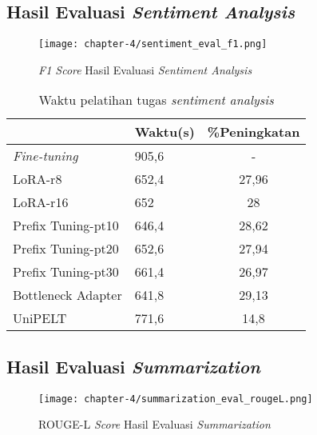 \subsection{Hasil Evaluasi \textit{Sentiment Analysis}}

\begin{figure}[h]
    \centering
    \texttt{[image: chapter-4/sentiment\_eval\_f1.png]}
    \caption{\textit{F1 Score} Hasil Evaluasi \textit{Sentiment Analysis}}
    \label{fig:sentiment-ner}
\end{figure}

\begin{table}[h]
    \centering
    \caption{Waktu pelatihan tugas \textit{sentiment analysis}}
    \label{table:runtime-sentiment}
    \begin{tabular}{|l|l|c|}
        \hline \rowcolor{black!10}
        \multicolumn{1}{|c|}{\textbf{Metode}} & \multicolumn{1}{|c|}{\textbf{Waktu(s)}} & \textbf{\%Peningkatan} \\ \hline
        \textit{Fine-tuning} & 905,6 & -  \\ \hline
        LoRA-r8 & 652,4 & 27,96 \\ \hline
        LoRA-r16 & 652 & 28 \\ \hline
        Prefix Tuning-pt10 & 646,4 & 28,62 \\ \hline
        Prefix Tuning-pt20 & 652,6 & 27,94 \\ \hline
        Prefix Tuning-pt30 & 661,4 & 26,97 \\ \hline
        Bottleneck Adapter & 641,8 & 29,13 \\ \hline
        UniPELT & 771,6 & 14,8 \\ \hline
    \end{tabular}
\end{table}

\subsection{Hasil Evaluasi \textit{Summarization}}

\begin{figure}[h]
    \centering
    \texttt{[image: chapter-4/summarization\_eval\_rougeL.png]}
    \caption{ROUGE-L \textit{Score} Hasil Evaluasi \textit{Summarization}}
    \label{fig:summarization-rouge-l}
\end{figure}

